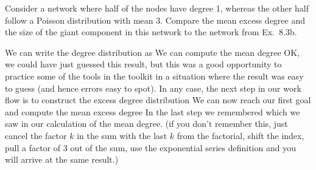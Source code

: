 Consider a network where half of the nodes have degree 1, whereas the other half follow a Poisson distribution with mean 3. Compare the mean excess degree and the size of the giant component in this network to the network from Ex.~8.3b. 

\solution
We can write the degree distribution as 
We can compute the mean degree 
OK, we could have just guessed this result, but this was a good opportunity to practice some of the tools in the toolkit in a situation where the result was easy to guess (and hence errors easy to spot). 
In any case, the next step in our work flow is to construct the excess degree distribution
We can now reach our first goal and compute the mean excess degree 
In the last step we remembered 
which we saw in our calculation of the mean degree. (if you don't remember this, just cancel the factor $k$ in the sum with the last $k$ from the factorial, shift the index, pull a factor of 3 out of the sum, use the exponential series definition and you will arrive at the same result.)  

